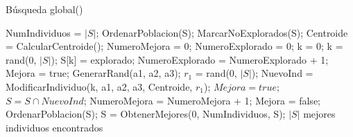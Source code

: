 

\begin{algorithm}[p]
  \caption{Búsqueda global(\mbox{})}
  \label{pseu:bg}
  \begin{algorithmic}[]
    \STATE NumIndividuos = $\left | S \right |$;
    \STATE OrdenarPoblacion(S);
    \STATE MarcarNoExplorados(S);
    \STATE Centroide = CalcularCentroide();
    \STATE NumeroMejora = 0;
    \STATE NumeroExplorado = 0;
      \STATE k = 0;
        \STATE k = rand(0, $\left | S \right |$);
      \ENDWHILE
      \STATE S[k] = explorado;
      \STATE NumeroExplorado = NumeroExplorado + 1;
      \STATE Mejora = true;
          \STATE GenerarRand(a1, a2, a3);
        \ENDWHILE
          \STATE $ r_{1}$ = rand(0, $\left | S \right |$);
        \ENDWHILE
        \STATE NuevoInd = ModificarIndividuo(k, a1, a2, a3, Centroide, $r_{1}$);
          \STATE $Mejora = true;$
          \STATE $S = S \cap NuevoInd$;
          \STATE NumeroMejora = NumeroMejora + 1;
          \ELSE
            \STATE Mejora = false;
        \ENDIF
      \ENDWHILE
    \ENDWHILE
    \STATE OrdenarPoblacion(S); 
    \STATE S = ObtenerMejores(0, NumIndividuos, S);
    \RETURN $\left | S \right |$ mejores individuos encontrados
  \end{algorithmic}
\end{algorithm}
